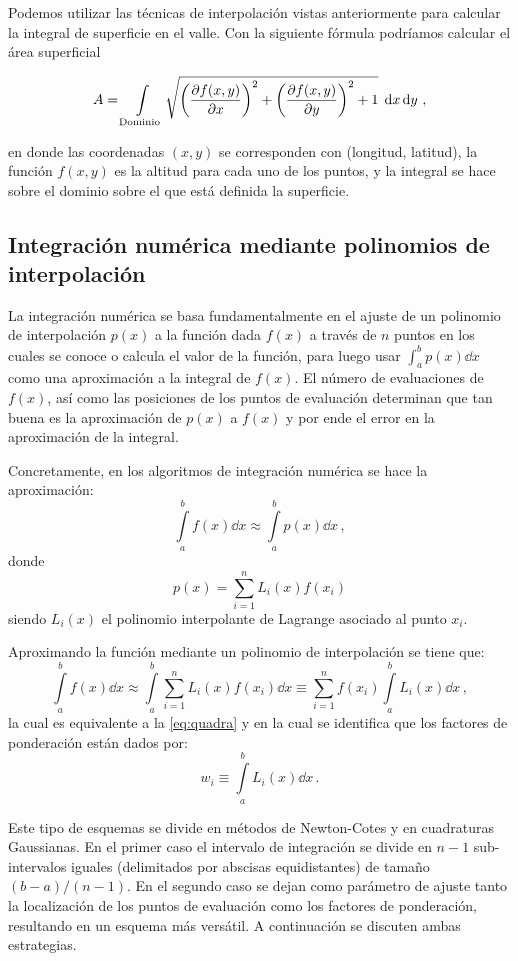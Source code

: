 Podemos utilizar las técnicas de interpolación vistas anteriormente para calcular la integral de superficie en el valle. Con la siguiente fórmula podríamos calcular el área superficial

\[A = \int\limits_\text{Dominio}{\sqrt{\left(\pdv{f(x, y)}{x}\right)^2 + 
\left(\pdv{f(x, y)}{y}\right)^2 + 1}}\; \dd{x}\dd{y}\, ,\]

en donde las coordenadas \((x, y)\) se corresponden con (longitud, latitud),  
la función \(f(x, y)\) es la altitud para cada uno de los puntos, y la integral 
se hace sobre el dominio sobre el que está definida la superficie.


\subsection{Integración numérica mediante polinomios de interpolación}

La integración numérica se basa fundamentalmente en el ajuste de un polinomio 
de interpolación $p(x)$ a la función dada $f(x)$ a través de $n$ puntos en 
los cuales se conoce o calcula el valor de la función, para luego usar 
$\int_a^b p(x)\dd{x}$ como una aproximación a la integral de $f(x)$. El número 
de evaluaciones de $f(x)$, así como las posiciones de los puntos de evaluación 
determinan que tan buena es la aproximación de $p(x)$ a $f(x)$ y por ende el 
error en la aproximación de la integral.

Concretamente, en los algoritmos de integración numérica se hace la aproximación:
\[\int\limits_a^b f(x) \dd{x} \approx \int\limits_a^b p(x) \dd{x}\, , \]
donde 
\[p(x) = \sum_{i=1}^n L_i(x) f(x_i)\]
siendo ${L_i}(x)$ el polinomio interpolante de Lagrange asociado al punto $x_i$.

Aproximando la función mediante un polinomio de interpolación se tiene que:
\[\int\limits_a^b f(x) \dd{x}  \approx \int\limits_a^b \sum_{i=1}^n 
L_i(x)f(x_i) \dd{x}  
\equiv \sum_{i=1}^n f(x_i)\int\limits_a^b L_i(x) \dd{x} \, , \]
la cual es equivalente a la \cref{eq:quadra} y en la cual se identifica que los 
factores de ponderación están dados por:
\begin{equation}
w_i \equiv \int\limits_a^b L_i(x) \dd{x} \, . 
\label{eq:pesos}
\end{equation}

Este tipo de esquemas se divide en métodos de Newton-Cotes y en cuadraturas 
Gaussianas. En el primer caso el intervalo de integración se divide en $n - 1$ 
sub-intervalos iguales (delimitados por abscisas equidistantes) de tamaño 
$(b-a)/(n - 1)$. En el segundo caso se dejan como parámetro de ajuste tanto la 
localización de los puntos de evaluación como los factores de ponderación, 
resultando en un esquema más versátil. A continuación se discuten ambas 
estrategias.


